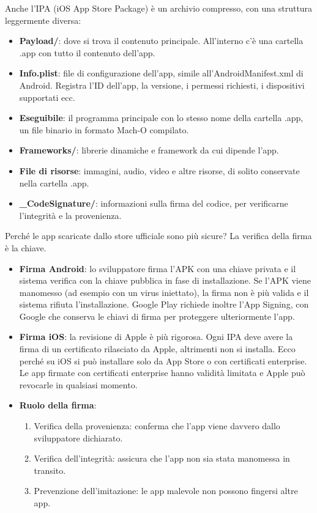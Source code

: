 Anche l'IPA (iOS App Store Package) è un archivio compresso, con una struttura leggermente diversa:

\begin{itemize}
  \item \textbf{Payload/}: dove si trova il contenuto principale. All'interno c'è una cartella .app con tutto il contenuto dell'app.
  \item \textbf{Info.plist}: file di configurazione dell'app, simile all'AndroidManifest.xml di Android. Registra l'ID dell'app, la versione, i permessi richiesti, i dispositivi supportati ecc.
  \item \textbf{Eseguibile}: il programma principale con lo stesso nome della cartella .app, un file binario in formato Mach-O compilato.
  \item \textbf{Frameworks/}: librerie dinamiche e framework da cui dipende l'app.
  \item \textbf{File di risorse}: immagini, audio, video e altre risorse, di solito conservate nella cartella .app.
  \item \textbf{\_CodeSignature/}: informazioni sulla firma del codice, per verificarne l'integrità e la provenienza.
\end{itemize}


Perché le app scaricate dallo store ufficiale sono più sicure? La verifica della firma è la chiave.

\begin{itemize}
  \item \textbf{Firma Android}: lo sviluppatore firma l'APK con una chiave privata e il sistema verifica con la chiave pubblica in fase di installazione. Se l'APK viene manomesso (ad esempio con un virus iniettato), la firma non è più valida e il sistema rifiuta l'installazione. Google Play richiede inoltre l'App Signing, con Google che conserva le chiavi di firma per proteggere ulteriormente l'app.
  \item \textbf{Firma iOS}: la revisione di Apple è più rigorosa. Ogni IPA deve avere la firma di un certificato rilasciato da Apple, altrimenti non si installa. Ecco perché su iOS si può installare solo da App Store o con certificati enterprise. Le app firmate con certificati enterprise hanno validità limitata e Apple può revocarle in qualsiasi momento.
  \item \textbf{Ruolo della firma}:
  \begin{enumerate}
    \item Verifica della provenienza: conferma che l'app viene davvero dallo sviluppatore dichiarato.
    \item Verifica dell'integrità: assicura che l'app non sia stata manomessa in transito.
    \item Prevenzione dell'imitazione: le app malevole non possono fingersi altre app.
  \end{enumerate}
\end{itemize}

